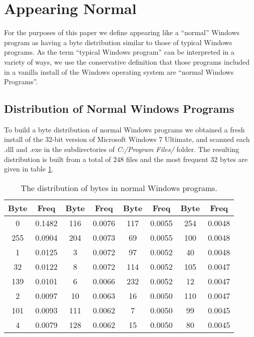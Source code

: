 \documentclass[finalcopy,short]{srpaper}
\begin{document}
    \section{Appearing Normal}

        For the purposes of this paper we define appearing like a ``normal''
        Windows program as having a byte distribution similar to those of
        typical Windows programs. As the term ``typical Windows program'' can be
        interpreted in a variety of ways, we use the conservative definition
        that those programs included in a vanilla install of the Windows
        operating system are ``normal Windows Programs''.
        
        \subsection{Distribution of Normal Windows Programs}

            To build a byte distribution of normal Windows programs we obtained
            a fresh install of the 32-bit version of Microsoft Windows 7
            Ultimate, and scanned each {.dll} and {.exe} in the subdirectories
            of \emph{C:/Program Files/} folder. The resulting distribution is
            built from a total of $248$ files and the most frequent $32$ bytes
            are given in table \ref{tab:results-Windows-dist}.

            \begin{table}
                \centering
                \begin{tabular}{|c|c||c|c||c|c||c|c|}
                    \hline
                    Byte & Freq & Byte & Freq & Byte & Freq & Byte & Freq \\
                    \hline
                    0 & 0.1482 & 116 & 0.0076 & 117 & 0.0055 & 254 & 0.0048 \\
                    \hline
                    255 & 0.0904 & 204 & 0.0073 & 69 & 0.0055 & 100 & 0.0048 \\
                    \hline
                    1 & 0.0125 & 3 & 0.0072 & 97 & 0.0052 & 40 & 0.0048 \\
                    \hline
                    32 & 0.0122 & 8 & 0.0072 & 114 & 0.0052 & 105 & 0.0047 \\
                    \hline
                    139 & 0.0101 & 6 & 0.0066 & 232 & 0.0052 & 12 & 0.0047 \\
                    \hline
                    2 & 0.0097 & 10 & 0.0063 & 16 & 0.0050 & 110 & 0.0047 \\
                    \hline
                    101 & 0.0093 & 111 & 0.0062 & 7 & 0.0050 & 99 & 0.0045 \\
                    \hline
                    4 & 0.0079 & 128 & 0.0062 & 15 & 0.0050 & 80 & 0.0045 \\
                    \hline
                \end{tabular}
                \caption{The distribution of bytes in normal Windows programs.}
                \label{tab:results-Windows-dist}
            \end{table}
\end{document}
